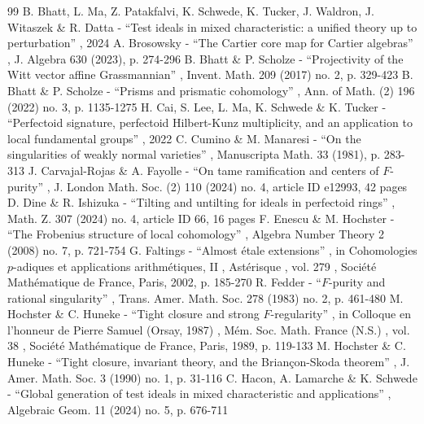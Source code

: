 \documentclass[11pt]{article}
\theoremstyle{plain}
\theoremstyle{definition}
\numberwithin{equation}{theorem}
\begin{document}
\begin{thebibliography}{99}
 B. Bhatt, L. Ma, Z. Patakfalvi, K. Schwede, K. Tucker, J. Waldron, J. Witaszek \& R. Datta - “Test ideals in mixed characteristic: a unified theory up to perturbation” , 2024
 A. Brosowsky - “The Cartier core map for Cartier algebras” , J. Algebra 630 (2023), p. 274-296
 B. Bhatt \& P. Scholze - “Projectivity of the Witt vector affine Grassmannian” , Invent. Math. 209 (2017) no. 2, p. 329-423
 B. Bhatt \& P. Scholze - “Prisms and prismatic cohomology” , Ann. of Math. (2) 196 (2022) no. 3, p. 1135-1275
 H. Cai, S. Lee, L. Ma, K. Schwede \& K. Tucker - “Perfectoid signature, perfectoid Hilbert-Kunz multiplicity, and an application to local fundamental groups” , 2022
 C. Cumino \& M. Manaresi - “On the singularities of weakly normal varieties” , Manuscripta Math. 33 (1981), p. 283-313
 J. Carvajal-Rojas \& A. Fayolle - “On tame ramification and centers of $F$-purity” , J. London Math. Soc. (2) 110 (2024) no. 4, article ID e12993, 42 pages
 D. Dine \& R. Ishizuka - “Tilting and untilting for ideals in perfectoid rings” , Math. Z. 307 (2024) no. 4, article ID 66, 16 pages
 F. Enescu \& M. Hochster - “The Frobenius structure of local cohomology” , Algebra Number Theory 2 (2008) no. 7, p. 721-754
 G. Faltings - “Almost étale extensions” , in Cohomologies $p$-adiques et applications arithmétiques, II , Astérisque , vol. 279 , Société Mathématique de France, Paris, 2002, p. 185-270
 R. Fedder - “$F$-purity and rational singularity” , Trans. Amer. Math. Soc. 278 (1983) no. 2, p. 461-480
 M. Hochster \& C. Huneke - “Tight closure and strong $F$-regularity” , in Colloque en l’honneur de Pierre Samuel (Orsay, 1987) , Mém. Soc. Math. France (N.S.) , vol. 38 , Société Mathématique de France, Paris, 1989, p. 119-133
 M. Hochster \& C. Huneke - “Tight closure, invariant theory, and the Briançon-Skoda theorem” , J. Amer. Math. Soc. 3 (1990) no. 1, p. 31-116
 C. Hacon, A. Lamarche \& K. Schwede - “Global generation of test ideals in mixed characteristic and applications” , Algebraic Geom. 11 (2024) no. 5, p. 676-711

\end{thebibliography}
\end{document}
